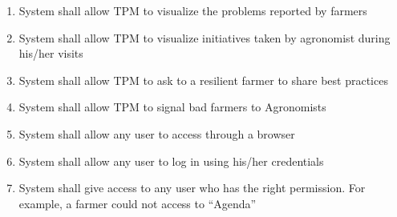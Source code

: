 \begin{enumerate} [label=\textbf{R.\arabic*}]
    \item System shall allow TPM to visualize the problems reported by farmers
    \item System shall allow TPM to visualize initiatives taken by agronomist during his/her visits
    \item System shall allow TPM to ask to a resilient farmer to share best practices
    \item System shall allow TPM to signal bad farmers to Agronomists
    \item System shall allow any user to access through a browser
    \item System shall allow any user to log in using his/her credentials
    \item System shall give access to any user who has the right permission. For example, a farmer could not access to “Agenda”
\end{enumerate}

